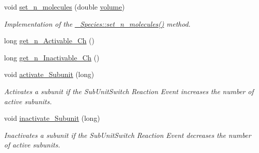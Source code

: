\begin{DoxyCompactItemize}
void \hyperlink{classnw_1_1_channel___spc_af8d5d7097d343e6646c6c11a1744024d}{set\+\_\+n\+\_\+molecules} (double \hyperlink{classnw_1_1___species_a80896a55f086f468396e76ae8f1e8285}{volume})
\begin{DoxyCompactList}\small\item\em Implementation of the \hyperlink{classnw_1_1___species_a53d06cca549a83bfff71303174707926}{\+\_\+\+Species\+::set\+\_\+n\+\_\+molecules()} method. \end{DoxyCompactList}\item 
long \hyperlink{classnw_1_1_channel___spc_aecd939824b8d2a275cbe360f60ae4a2d}{get\+\_\+n\+\_\+\+Activable\+\_\+\+Ch} ()
\item 
long \hyperlink{classnw_1_1_channel___spc_a99c02ea4a145d6531ed2328de073fb37}{get\+\_\+n\+\_\+\+Inactivable\+\_\+\+Ch} ()
\item 
void \hyperlink{classnw_1_1_channel___spc_ab5176b0d9aed2ac68a142488d11b5e81}{activate\+\_\+\+Subunit} (long)
\begin{DoxyCompactList}\small\item\em Activates a subunit if the Sub\+Unit\+Switch Reaction Event increases the number of active subunits. \end{DoxyCompactList}\item 
void \hyperlink{classnw_1_1_channel___spc_a190172435ab84f9210ae027d06aae81a}{inactivate\+\_\+\+Subunit} (long)
\begin{DoxyCompactList}\small\item\em Inactivates a subunit if the Sub\+Unit\+Switch Reaction Event decreases the number of active subunits. \end{DoxyCompactList}\end{DoxyCompactItemize}
